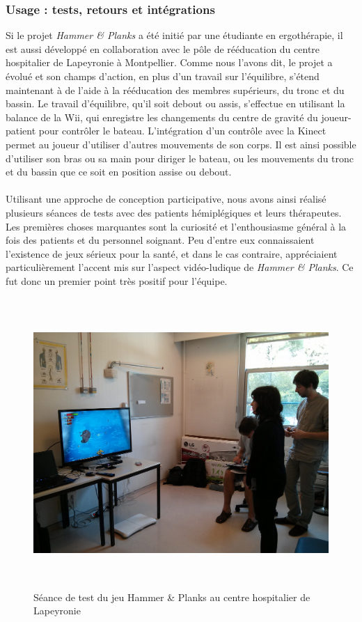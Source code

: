 	\subsubsection*{Usage : tests, retours et intégrations}
Si le projet \emph{Hammer \& Planks} a été initié par une étudiante en ergothérapie, il est aussi développé en collaboration avec le pôle de rééducation du centre hospitalier de Lapeyronie à Montpellier. Comme nous l'avons dit, le projet a évolué et son champs d'action, en plus d'un travail sur l'équilibre, s'étend maintenant à de l'aide à la rééducation des membres supérieurs, du tronc et du bassin. Le travail d'équilibre, qu'il soit debout ou assis, s'effectue en utilisant la balance de la Wii, qui enregistre les changements du centre de gravité du joueur-patient pour contrôler le bateau. L'intégration d'un contrôle avec la Kinect permet au joueur d'utiliser d'autres mouvements de son corps. Il est ainsi possible d'utiliser son bras ou sa main pour diriger le bateau, ou les mouvements du tronc et du bassin que ce soit en position assise ou debout.

\paragraph{} Utilisant une approche de conception participative, nous avons ainsi réalisé plusieurs séances de tests avec des patients hémiplégiques et leurs thérapeutes. \\
Les premières choses marquantes sont la curiosité et l'enthousiasme général à la fois des patients et du personnel soignant. Peu d'entre eux connaissaient l'existence de jeux sérieux pour la santé, et dans le cas contraire, appréciaient particulièrement l'accent mis sur l'aspect vidéo-ludique de \emph{Hammer \& Planks}. Ce fut donc un premier point très positif pour l'équipe.
\begin{figure}[hbt]
	\centering
	\includegraphics[height=11cm]{images/test_lapeyronie_3.jpg}
	\caption{Séance de test du jeu Hammer \& Planks au centre hospitalier de Lapeyronie}
	\label{test_lapeyronie}
\end{figure}
